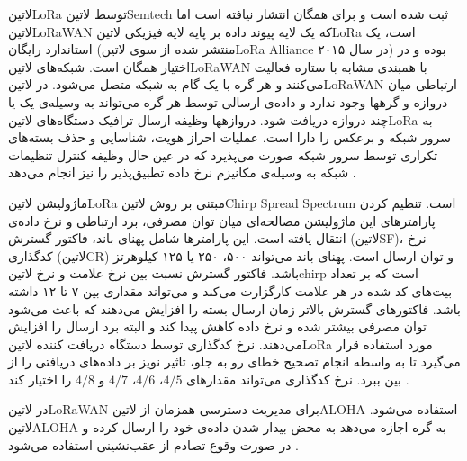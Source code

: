 ‌لاتین{LoRa} توسط ‌لاتین{Semtech} ثبت شده است و برای همگان انتشار نیافته است اما ‌لاتین{LoRaWAN} که یک لایه پیوند داده بر پایه لایه فیزیکی ‌لاتین{LoRa}
است، یک استاندارد رایگان (منتشر شده از سوی ‌لاتین{LoRa Alliance} در سال ۲۰۱۵) بوده و در اختیار همگان است.
شبکه‌های ‌لاتین{LoRaWAN} با همبندی مشابه با ستاره فعالیت می‌کنند و هر گره با یک گام به شبکه متصل می‌شود.
در ‌لاتین{LoRaWAN} ارتباطی میان دروازه و گرهها وجود ندارد و داده‌ی ارسالی توسط هر گره می‌تواند به وسیله‌ی یک یا چند دروازه دریافت شود.
دروازهها وظیفه ارسال ترافیک دستگاه‌های ‌لاتین{LoRa} به سرور شبکه و برعکس را دارا است.
عملیات احراز هویت، شناسایی و حذف بسته‌های تکراری توسط سرور شبکه صورت می‌پذیرد که در عین حال وظیفه کنترل
تنظیمات شبکه به وسیله‌ی مکانیزم نرخ داده تطبیق‌پذیر را نیز انجام می‌دهد .

ماژولیشن ‌لاتین{LoRa} مبتنی بر روش ‌لاتین{Chirp Spread Spectrum} است. تنظیم کردن پارامترهای این ماژولیشن
مصالحه‌ای میان توان مصرفی، برد ارتباطی و نرخ داده‌ی انتقال یافته است.
این پارامترها شامل پهنای باند، فاکتور گسترش (‌لاتین{SF})، نرخ کدگذاری (‌لاتین{CR}) و توان ارسال است.
پهنای باند می‌تواند ۵۰۰، ۲۵۰ یا ۱۲۵ کیلوهرتز باشد.
فاکتور گسترش نسبت بین نرخ علامت و نرخ ‌لاتین{chirp} است که بر تعداد بیت‌های کد شده در هر علامت کارگزارت می‌کند و می‌تواند مقداری بین ۷ تا ۱۲ داشته باشد.
فاکتورهای گسترش بالاتر زمان ارسال بسته را افزایش می‌دهند که باعث می‌شود توان مصرفی بیشتر شده و نرخ داده کاهش پیدا کند و البته برد ارسال را افزایش می‌دهند.
نرخ کدگذاری توسط دستگاه دریافت کننده ‌لاتین{LoRa} مورد استفاده قرار می‌گیرد تا به واسطه انجام تصحیح خطای رو به جلو، تاثیر نویز بر داده‌های دریافتی را از بین ببرد.
نرخ کدگذاری می‌تواند مقدارهای $4/5$، $4/6$، $4/7$ و $4/8$ را اختیار کند
.

در ‌لاتین{LoRaWAN} برای مدیریت دسترسی همزمان از ‌لاتین{ALOHA} استفاده می‌شود.
‌لاتین{ALOHA} به گره اجازه می‌دهد به محض بیدار شدن داده‌ی خود را ارسال کرده و در صورت وقوع تصادم
از عقب‌نشینی استفاده می‌شود
.

